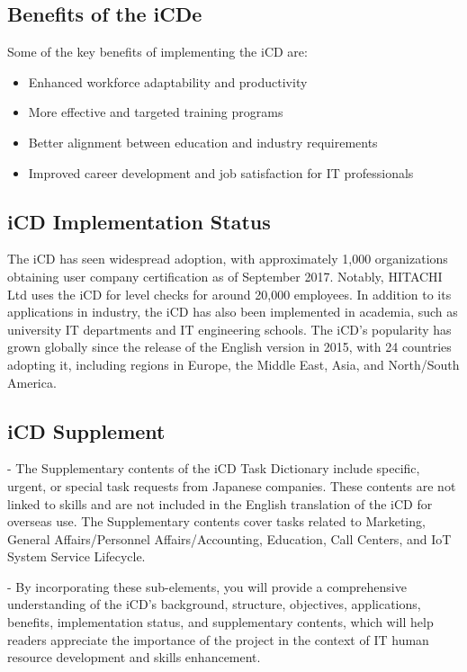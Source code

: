 \subsection{Benefits of the iCDe}
Some of the key benefits of implementing the iCD are:
\begin{itemize}
    \item Enhanced workforce adaptability and productivity
    \item More effective and targeted training programs
    \item Better alignment between education and industry requirements
    \item Improved career development and job satisfaction for IT professionals
\end{itemize}


\subsection{iCD Implementation Status}
The iCD has seen widespread adoption, with approximately 1,000 organizations obtaining user company certification as of September 2017. Notably, HITACHI Ltd uses the iCD for level checks for around 20,000 employees. In addition to its applications in industry, the iCD has also been implemented in academia, such as university IT departments and IT engineering schools. The iCD's popularity has grown globally since the release of the English version in 2015, with 24 countries adopting it, including regions in Europe, the Middle East, Asia, and North/South America.

\subsection{iCD Supplement}
- The Supplementary contents of the iCD Task Dictionary include specific, urgent, or special task requests from Japanese companies. These contents are not linked to skills and are not included in the English translation of the iCD for overseas use. The Supplementary contents cover tasks related to Marketing, General Affairs/Personnel Affairs/Accounting, Education, Call Centers, and IoT System Service Lifecycle.

- By incorporating these sub-elements, you will provide a comprehensive understanding of the iCD's background, structure, objectives, applications, benefits, implementation status, and supplementary contents, which will help readers appreciate the importance of the project in the context of IT human resource development and skills enhancement.


